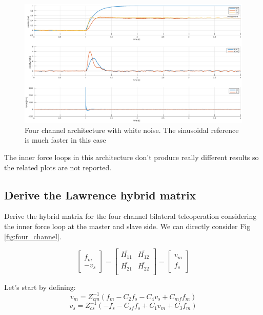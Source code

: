 \documentclass[a4paper,12pt]{article}
\begin{document}
\begin{figure}[H]
    \begin{center}
        \hspace*{-4.2cm}
        \includegraphics[scale=0.5]{images/four_step_kalman_2.eps}
    \end{center}
    \caption{Four channel architecture with white noise. The sinusoidal reference is much faster in this case}
    \label{fig:four_noisy}
\end{figure}

\bigskip
\noindent The inner force loops in this architecture don't produce really different results so the related plots are not reported. 

\subsection{Derive the Lawrence hybrid matrix}

Derive the hybrid matrix for the four channel bilateral teleoperation considering the inner force loop at the master and slave side. We can directly consider Fig \ref{fig:four_channel}.

\[
\begin{bmatrix}  f_m \\ -v_s \end{bmatrix} = \begin{bmatrix}
    \overline{H_{11}} & \overline{H_{12}} \\
    \overline{H_{21}} &  \overline{H_{22}} \\
\end{bmatrix} = \begin{bmatrix}  v_m \\ f_s \end{bmatrix}
\]

\noindent Let's start by defining:
\begin{equation}
    v_m = Z_{cm}^{-1}(f_m -C_2f_s-C_4v_s+C_{mf}f_m)
\end{equation}
\begin{equation}
    v_s = Z_{cs}^{-1}(-f_s -C_{sf}f_s+C_1v_m+C_3f_m)
\end{equation}
\end{document}
